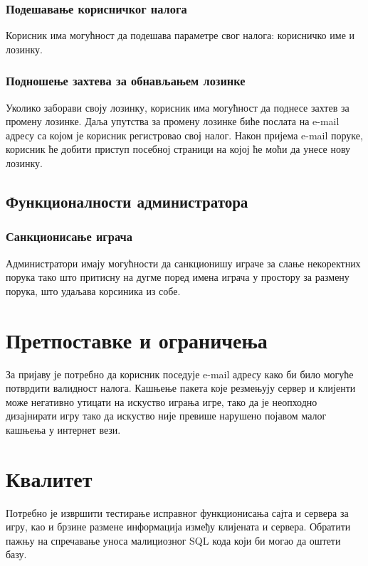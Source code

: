 \subsubsection{Подешавање корисничког налога}
Корисник има могућност да подешава параметре свог налога: корисничко име и лозинку.

\subsubsection{Подношење захтева за обнављањем лозинке}
Уколико заборави своју лозинку, корисник има могућност да поднесе захтев за промену лозинке. 
Даља упутства за промену лозинке биће послата на e-mail адресу
са којом је корисник регистровао свој налог.
Након пријема e-mail поруке, корисник ће добити приступ посебној
страници на којој ће моћи да унесе нову лозинку.

\subsection{Функционалности администратора}

\subsubsection{Санкционисање играча}
Администратори имају могућности да санкционишу играче за слање некоректних порука тако што притисну на дугме поред
имена играча у простору за размену порука, што удаљава корсиника из собе.



\section{Претпоставке и ограничења}
За пријаву је потребно да корисник поседује e-mail адресу како би било могуће потврдити валидност налога.
Кашњење пакета које резмењују сервер и клијенти може негативно утицати на искуство играња игре, тако да је
неопходно дизајнирати игру тако да искуство није превише нарушено појавом малог кашњења у интернет вези.



\section{Квалитет}
Потребно је извршити тестирање исправног функционисања сајта и сервера за игру, као и брзине размене информација
између клијената и сервера. Обратити пажњу на спречавање уноса малициозног SQL кода који би могао да оштети базу.



